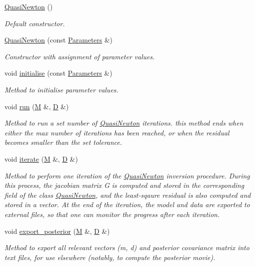 \begin{DoxyCompactItemize}
\item 
\hypertarget{class_quasi_newton_acaf2392549a58260df32c0b77a175236}{}\hyperlink{class_quasi_newton_acaf2392549a58260df32c0b77a175236}{Quasi\+Newton} ()\label{class_quasi_newton_acaf2392549a58260df32c0b77a175236}

\begin{DoxyCompactList}\small\item\em Default constructor. \end{DoxyCompactList}\item 
\hyperlink{class_quasi_newton_acdf5d9bfe6f52db5abf04c372fa9192b}{Quasi\+Newton} (const \hyperlink{class_parameters}{Parameters} \&)
\begin{DoxyCompactList}\small\item\em Constructor with assignment of parameter values. \end{DoxyCompactList}\item 
void \hyperlink{class_quasi_newton_ae970b4a40406d2a1f1bbaf97f3ee5708}{initialise} (const \hyperlink{class_parameters}{Parameters} \&)
\begin{DoxyCompactList}\small\item\em Method to initialise parameter values. \end{DoxyCompactList}\item 
void \hyperlink{class_quasi_newton_ad6b725714c4ef6aeb9b40084051eda6f}{run} (\hyperlink{class_m}{M} \&, \hyperlink{class_d}{D} \&)
\begin{DoxyCompactList}\small\item\em Method to run a set number of \hyperlink{class_quasi_newton}{Quasi\+Newton} iterations. this method ends when either the max number of iterations has been reached, or when the residual becomes smaller than the set tolerance. \end{DoxyCompactList}\item 
void \hyperlink{class_quasi_newton_afe8797743864a335e5f3e636d6685903}{iterate} (\hyperlink{class_m}{M} \&, \hyperlink{class_d}{D} \&)
\begin{DoxyCompactList}\small\item\em Method to perform one iteration of the \hyperlink{class_quasi_newton}{Quasi\+Newton} inversion procedure. During this process, the jacobian matrix G is computed and stored in the corresponding field of the class \hyperlink{class_quasi_newton}{Quasi\+Newton}, and the least-\/sqaure residual is also computed and stored in a vector. At the end of the iteration, the model and data are exported to external files, so that one can monitor the progress after each iteration. \end{DoxyCompactList}\item 
void \hyperlink{class_quasi_newton_a6f48065d6c82b0d4679f53e7980a79c6}{export\+\_\+posterior} (\hyperlink{class_m}{M} \&, \hyperlink{class_d}{D} \&)
\begin{DoxyCompactList}\small\item\em Method to export all relevant vectors (m, d) and posterior covariance matrix into text files, for use elsewhere (notably, to compute the posterior movie). \end{DoxyCompactList}\end{DoxyCompactItemize}
